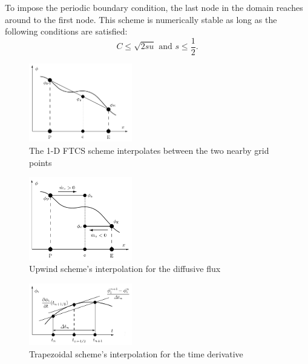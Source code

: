 \documentclass[twocolumn,10pt]{asme2ej}
\begin{document}
\noindent To impose the periodic boundary condition, the last node in the domain reaches around to the first node. This scheme is numerically stable as long as the following conditions are satisfied:
\begin{equation}
\label{FTCS_stability}
C \leq \sqrt{2su} \mbox{ and } s \leq \frac{1}{2}.
\end{equation}

\begin{figure}[t]
\begin{center}
\includegraphics[width=0.4\textwidth]{figure/FTCS.png}
\caption{The 1-D FTCS scheme interpolates between the two nearby grid points \cite{analytic_citation}}
\label{FTCS_scheme}
\end{center}
\end{figure}

\begin{figure}[t]
\begin{center}
\includegraphics[width=0.4\textwidth]{figure/Upwind.png}
\caption{Upwind scheme's interpolation for the diffusive flux \cite{analytic_citation}}
\label{Upwind_scheme}
\end{center}
\end{figure}

\begin{figure}[t]
\begin{center}
\includegraphics[width=0.4\textwidth]{figure/Trapezoidal (time derivative).png}
\caption{Trapezoidal scheme's interpolation for the time derivative \cite{analytic_citation}}
\label{Trapezoidal_scheme}
\end{center}
\end{figure}
\end{document}
